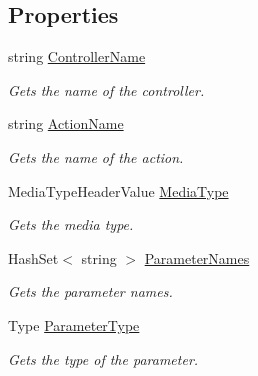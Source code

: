 \subsection*{Properties}
\begin{DoxyCompactItemize}
\item 
string \hyperlink{class_open_1_1_g_i_1_1hypermart_1_1_areas_1_1_help_page_1_1_help_page_sample_key_a8045e8479b1f6b2f1bb4f51c96fc7591}{Controller\+Name}
\begin{DoxyCompactList}\small\item\em Gets the name of the controller. \end{DoxyCompactList}\item 
string \hyperlink{class_open_1_1_g_i_1_1hypermart_1_1_areas_1_1_help_page_1_1_help_page_sample_key_aaa937f6039e7b88ba4fade25831f0295}{Action\+Name}
\begin{DoxyCompactList}\small\item\em Gets the name of the action. \end{DoxyCompactList}\item 
Media\+Type\+Header\+Value \hyperlink{class_open_1_1_g_i_1_1hypermart_1_1_areas_1_1_help_page_1_1_help_page_sample_key_a55d7490220ed44dd3611a3982b802850}{Media\+Type}
\begin{DoxyCompactList}\small\item\em Gets the media type. \end{DoxyCompactList}\item 
Hash\+Set$<$ string $>$ \hyperlink{class_open_1_1_g_i_1_1hypermart_1_1_areas_1_1_help_page_1_1_help_page_sample_key_af57a533cea792e25a70fda6695a65c46}{Parameter\+Names}
\begin{DoxyCompactList}\small\item\em Gets the parameter names. \end{DoxyCompactList}\item 
Type \hyperlink{class_open_1_1_g_i_1_1hypermart_1_1_areas_1_1_help_page_1_1_help_page_sample_key_afa5b00d332331b114e9391367bda2bf0}{Parameter\+Type}
\begin{DoxyCompactList}\small\item\em Gets the type of the parameter. \end{DoxyCompactList}\item 

\end{DoxyCompactItemize}
